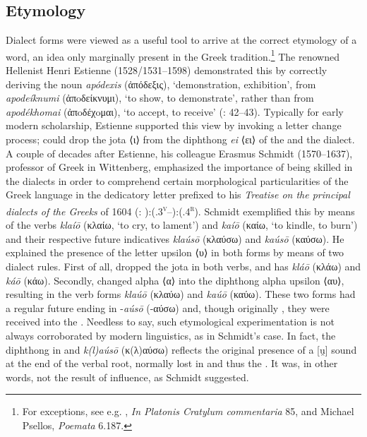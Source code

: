 \subsection{Etymology}

Dialect forms were viewed as a useful tool to arrive at the correct etymology of a word, an idea only marginally present in the Greek tradition.\footnote{For exceptions, see e.g. , \textit{In Platonis Cratylum commentaria} 85, and Michael Psellos, \textit{Poemata} 6.187.} The renowned  Hellenist Henri Estienne (1528/1531–1598) demonstrated this by correctly deriving the  noun \textit{apódexis} (ἀπόδεξις), ‘demonstration, exhibition’, from \textit{apodeíknumi} (ἀπoδείκνυμι), ‘to show, to demonstrate’, rather than from \textit{apodékhomai} (ἀπoδέχoμαι), ‘to accept, to receive’ (\citealt{Estienne1581}: 42–43). Typically for early modern scholarship, Estienne supported this view by invoking a letter change process;  could drop the jota ⟨ι⟩ from the diphthong \textit{ei} ⟨ει⟩ of the  and the  dialect. A couple of decades after Estienne, his  colleague Erasmus Schmidt (1570–1637), professor of Greek in Wittenberg, emphasized the importance of being skilled in the dialects in order to comprehend certain morphological particularities of the Greek language in the dedicatory letter prefixed to his \textit{Treatise on the principal dialects of the Greeks} of 1604 (\citealt{Schmidt1604}: {\footnotesize{):(}}.3\textsc{\textsuperscript{v}}–{\footnotesize{):(}}.4\textsc{\textsuperscript{r}}). Schmidt exemplified this by means of the  verbs \textit{klaíō} (κλαίω, ‘to cry, to lament’) and \textit{kaíō} (καίω, ‘to kindle, to burn’) and their respective future indicatives \textit{klaúsō} (κλαύσω) and \textit{kaúsō} (καύσω). He explained the presence of the letter upsilon ⟨υ⟩ in both forms by means of two dialect rules. First of all,  dropped the jota in both verbs, and has \textit{kláō} (κλάω) and \textit{káō} (κάω). Secondly,  changed alpha ⟨α⟩ into the diphthong alpha upsilon ⟨αυ⟩, resulting in the verb forms \textit{klaúō} (κλαύω) and \textit{kaúō} (καύω). These two  forms had a regular future ending in -\textit{aúsō} (-αύσω) and, though originally , they were received into the . Needless to say, such etymological experimentation is not always corroborated by modern linguistics, as in Schmidt’s case.{} In fact, the diphthong in  and  \textit{k(l)aúsō} (κ(λ)αύσω) reflects the original presence of a [u̯] sound at the end of the verbal root, normally lost in  and thus the . It was, in other words, not the result of  influence, as Schmidt suggested.


